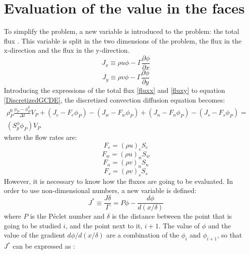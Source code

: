 \section{Evaluation of the value in the faces}
To simplify the problem, a new variable is introduced to the problem: the total flux \cite{Patankar1980}. This variable is split in the two dimensions of the problem, the flux in the x-direction and the flux in the y-direction.
\begin{equation}
J_{x}\equiv\rho u\phi-\Gamma\frac{\partial\phi}{\partial x}
\label{fluxx}
\end{equation}
\begin{equation}
J_{y}\equiv\rho v\phi-\Gamma\frac{\partial\phi}{\partial y}
\label{fluxy}
\end{equation}
Introducing the expressions of the total flux \ref{fluxx} and \ref{fluxy} to equation \ref{DiscretizedGCDE}, the discretized convection diffusion equation becomes:
\begin{multline}
\rho_{P}^{0}\frac{\phi_{P}-\phi_{P}^{0}}{\Delta t}V_{P}+\left(J_{e}-F_{e}\phi_{P}\right)-\left(J_{w}-F_{w}\phi_{P}\right)+\left(J_{n}-F_{n}\phi_{P}\right)-\left(J_{s}-F_{s}\phi_{P}\right)= \\
\left(S_{p}^{\phi}\phi_{P}\right)V_{P}
\label{FinalDiscrGCDE}
\end{multline}
where the flow rates are:
\begin{equation}
F_{e}=\left(\rho u\right)_{e}S_{e}
\end{equation}
\begin{equation}
F_{w}=\left(\rho u\right)_{w}S_{w}
\end{equation}
\begin{equation}
F_{n}=\left(\rho v\right)_{n}S_{n}
\end{equation}
\begin{equation}
F_{s}=\left(\rho v\right)_{s}S_{s}
\end{equation}
However, it is necessary to know how the fluxes are going to be evaluated. In order to use non-dimensional numbers, a new variable is defined:
\begin{equation}
J^{*}\equiv\frac{J\delta}{\Gamma}=P\phi-\frac{d\phi}{d\left(x/\delta\right)}
\end{equation}
where $P$ is the Péclet number and $\delta$ is the distance between the point that is going to be studied $i$, and the point next to it, $i+1$. The value of $\phi$ and the value of the gradient $d\phi/d\left(x/\delta\right)$ are a combination of the $\phi_{i}$ and $\phi_{i+1}$, so that $J^{*}$ can be expressed as \cite{Patankar1980}:
